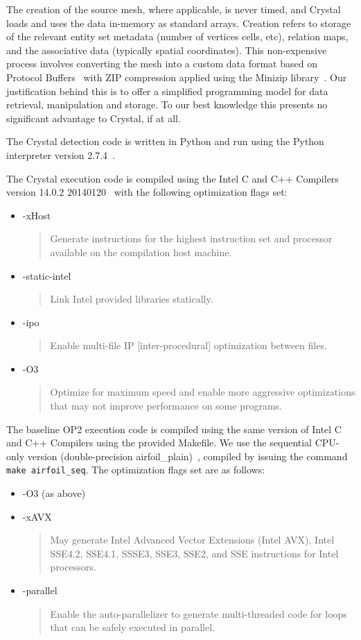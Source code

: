 The creation of the source mesh, where applicable, is never timed, and Crystal loads and uses the data in-memory as standard arrays. Creation refers to storage of the relevant entity set metadata (number of vertices cells, etc), relation maps, and the associative data (typically spatial coordinates). This non-expensive process involves converting the mesh into a custom data format based on Protocol Buffers~\cite{protocolbuffers} with ZIP compression applied using the Minizip library~\cite{minizip}. Our justification behind this is to offer a simplified programming model for data retrieval, manipulation and storage. To our best knowledge this presents no significant advantage to Crystal, if at all.

The Crystal detection code is written in Python and run using the Python interpreter version 2.7.4~\cite{python}.

The Crystal execution code is compiled using the Intel\textregistered{} C and C++ Compilers version 14.0.2 20140120~\cite{icc} with the following optimization flags set:
\begin{itemize}
\item -xHost
\begin{quote}Generate instructions for the highest instruction set and processor available on the compilation host machine.\end{quote}
\item -static-intel
\begin{quote}Link Intel provided libraries statically.\end{quote}
\item -ipo
\begin{quote}Enable multi-file IP [inter-procedural] optimization between files.\end{quote}
\item -O3
\begin{quote}Optimize for maximum speed and enable more aggressive optimizations that may not improve performance on some programs.\end{quote}
\end{itemize}

The baseline OP2 execution code is compiled using the same version of Intel\textregistered{} C and C++ Compilers using the provided Makefile. We use the sequential CPU-only version (double-precision airfoil\_plain)~\cite{op2airfoil}, compiled by issuing the command \texttt{make airfoil\_seq}. The optimization flags set are as follows:
\begin{itemize}
\item -O3 (as above)
\item -xAVX
\begin{quote}May generate Intel\textregistered{} Advanced Vector Extensions (Intel\textregistered{} AVX), Intel\textregistered{} SSE4.2, SSE4.1, SSSE3, SSE3, SSE2, and SSE instructions for Intel\textregistered{} processors.\end{quote}
\item -parallel
\begin{quote}Enable the auto-parallelizer to generate multi-threaded code for loops that can be safely executed in parallel.\end{quote}
\end{itemize}


